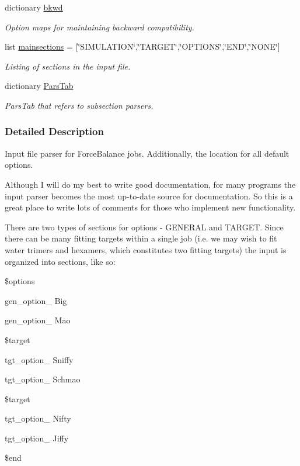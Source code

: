 \begin{DoxyCompactItemize}
dictionary \hyperlink{namespaceforcebalance_1_1parser_a121eaaef101563523a8fb20bd5ace409}{bkwd}
\begin{DoxyCompactList}\small\item\em Option maps for maintaining backward compatibility. \end{DoxyCompactList}\item 
list \hyperlink{namespaceforcebalance_1_1parser_a682a3870774181592a7a4784ab108ae6}{mainsections} = \mbox{[}\char`\"{}S\-I\-M\-U\-L\-A\-T\-I\-O\-N\char`\"{},\char`\"{}T\-A\-R\-G\-E\-T\char`\"{},\char`\"{}O\-P\-T\-I\-O\-N\-S\char`\"{},\char`\"{}E\-N\-D\char`\"{},\char`\"{}N\-O\-N\-E\char`\"{}\mbox{]}
\begin{DoxyCompactList}\small\item\em Listing of sections in the input file. \end{DoxyCompactList}\item 
dictionary \hyperlink{namespaceforcebalance_1_1parser_a492c80e361e80dc74aebc13e7a072dfb}{Pars\-Tab}
\begin{DoxyCompactList}\small\item\em Pars\-Tab that refers to subsection parsers. \end{DoxyCompactList}\end{DoxyCompactItemize}


\subsubsection{Detailed Description}
Input file parser for Force\-Balance jobs. Additionally, the location for all default options.

Although I will do my best to write good documentation, for many programs the input parser becomes the most up-\/to-\/date source for documentation. So this is a great place to write lots of comments for those who implement new functionality.

There are two types of sections for options -\/ G\-E\-N\-E\-R\-A\-L and T\-A\-R\-G\-E\-T. Since there can be many fitting targets within a single job (i.\-e. we may wish to fit water trimers and hexamers, which constitutes two fitting targets) the input is organized into sections, like so\-:

\$options\par
 gen\-\_\-option\-\_ Big\par
 gen\-\_\-option\-\_ Mao\par
 \$target\par
 tgt\-\_\-option\-\_ Sniffy\par
 tgt\-\_\-option\-\_ Schmao\par
 \$target\par
 tgt\-\_\-option\-\_ Nifty\par
 tgt\-\_\-option\-\_ Jiffy\par
 \$end

